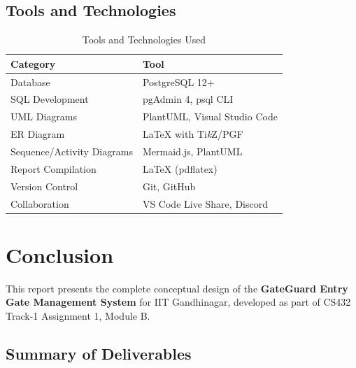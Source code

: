 \documentclass[a4paper, 12pt]{article}
\begin{document}
\subsection{Tools and Technologies}

\begin{table}[H]
\centering
\caption{Tools and Technologies Used}
\label{tab:tools}
\begin{tabularx}{\textwidth}{l X}
\toprule
\textbf{Category} & \textbf{Tool} \\
\midrule
Database & PostgreSQL 12+ \\
SQL Development & pgAdmin 4, psql CLI \\
UML Diagrams & PlantUML, Visual Studio Code \\
ER Diagram & \LaTeX{} with Ti\textit{k}Z/PGF \\
Sequence/Activity Diagrams & Mermaid.js, PlantUML \\
Report Compilation & \LaTeX{} (pdflatex) \\
Version Control & Git, GitHub \\
Collaboration & VS Code Live Share, Discord \\
\bottomrule
\end{tabularx}
\end{table}

\newpage
\section{Conclusion}
\label{sec:conclusion}

This report presents the complete conceptual design of the \textbf{GateGuard Entry Gate Management System} for IIT Gandhinagar, developed as part of CS432 Track-1 Assignment 1, Module B.

\subsection{Summary of Deliverables}
\end{document}

